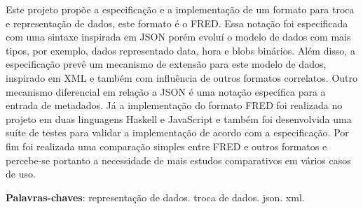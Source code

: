 \begin{resumo}

Este projeto propõe a especificação e a implementação de um formato para
troca e representação de dados, este formato é o FRED. Essa notação foi 
especificada com uma sintaxe inspirada em JSON porém evoluí o modelo de 
dados com mais tipos, por exemplo, dados representado data, hora e blobs 
binários. Além disso, a especificação prevê um mecanismo de extensão 
para este modelo de dados, inspirado em XML e também com influência de 
outros formatos correlatos. Outro mecanismo diferencial em relação a JSON 
é uma notação específica para a entrada de metadados. Já a implementação do 
formato FRED foi realizada no projeto em duas linguagens Haskell e JavaScript 
e também foi desenvolvida uma suíte de testes para validar a implementação 
de acordo com a especificação. Por fim foi realizada uma comparação simples 
entre FRED e outros formatos e percebe-se portanto a necessidade de mais 
estudos comparativos em vários casos de uso.

 \vspace{\onelineskip}
    
 \noindent
 \textbf{Palavras-chaves}: representação de dados. troca de dados. json. xml.
\end{resumo}
